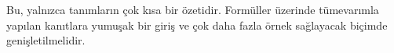 


\begin{editorial}
  Bu, yalnızca tanımların çok kısa bir özetidir. Formüller üzerinde
  tümevarımla yapılan kanıtlara yumuşak bir giriş ve çok daha fazla örnek
  sağlayacak biçimde genişletilmelidir.
\end{editorial}







\OLEndChapterHook

